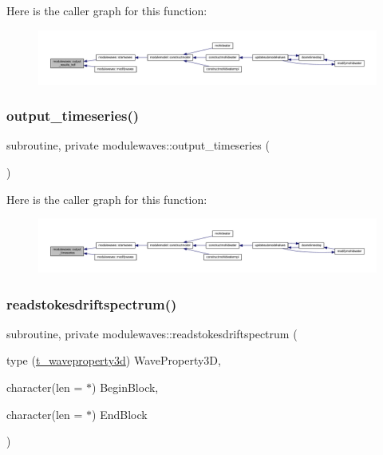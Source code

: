 Here is the caller graph for this function\+:\nopagebreak
\begin{figure}[H]
\begin{center}
\leavevmode
\includegraphics[width=350pt]{namespacemodulewaves_a89f925f57b1b3b8af0ce6bb51398f224_icgraph}
\end{center}
\end{figure}
\mbox{\label{namespacemodulewaves_ad7f81476715cc55364572aacbf0b2696}} 
\subsubsection{\texorpdfstring{output\+\_\+timeseries()}{output\_timeseries()}}
{\footnotesize\ttfamily subroutine, private modulewaves\+::output\+\_\+timeseries (\begin{DoxyParamCaption}{ }\end{DoxyParamCaption})\hspace{0.3cm}{\ttfamily [private]}}

Here is the caller graph for this function\+:\nopagebreak
\begin{figure}[H]
\begin{center}
\leavevmode
\includegraphics[width=350pt]{namespacemodulewaves_ad7f81476715cc55364572aacbf0b2696_icgraph}
\end{center}
\end{figure}
\mbox{\label{namespacemodulewaves_a8f1215445f8fd38dbf41e7339b28cf9f}} 
\subsubsection{\texorpdfstring{readstokesdriftspectrum()}{readstokesdriftspectrum()}}
{\footnotesize\ttfamily subroutine, private modulewaves\+::readstokesdriftspectrum (\begin{DoxyParamCaption}\item[{type (\mbox{\hyperlink{structmodulewaves_1_1t__waveproperty3d}{t\+\_\+waveproperty3d}})}]{Wave\+Property3D,  }\item[{character(len = $\ast$)}]{Begin\+Block,  }\item[{character(len = $\ast$)}]{End\+Block }\end{DoxyParamCaption})\hspace{0.3cm}{\ttfamily [private]}}

